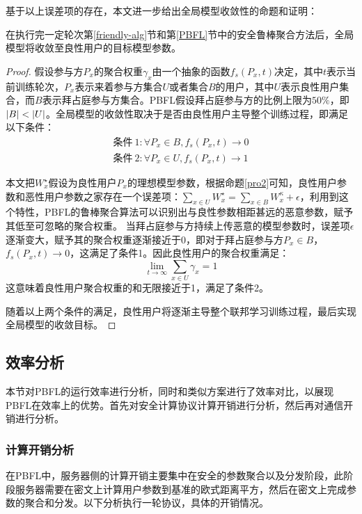 基于以上误差项的存在，本文进一步给出全局模型收敛性的命题和证明：
\begin{proposition}[收敛性]
	在执行完一定轮次第\ref{friendly-alg}节和第\ref{PBFL}节中的安全鲁棒聚合方法后，全局模型将收敛至良性用户的目标模型参数。
\end{proposition}

\begin{proof}
	假设参与方$P_x$的聚合权重$\gamma_{x}$由一个抽象的函数$f_s(P_x,t)$决定，其中$t$表示当前训练轮次，$P_x$表示来着参与方集合$U$或者集合$B$的用户，其中$ U $表示良性用户集合，而$ B $表示拜占庭参与方集合。PBFL假设拜占庭参与方的比例上限为$50\%$，即$\vert B\vert <\vert U\vert$。全局模型的收敛性取决于是否由良性用户主导整个训练过程，即满足以下条件：
	\begin{equation*}
		\begin{split}
			\mbox{条件}\ 1:{\forall}P_x \in B, f_s(P_x,t)\rightarrow 0 \\
			\mbox{条件}\ 2:{\forall}P_x \in U, f_s(P_x,t)\rightarrow 1
		\end{split}
	\end{equation*}
	
	本文把$W_x^{\star}$假设为良性用户$P_x$的理想模型参数，根据命题\ref{pro2}可知，良性用户参数和恶性用户参数之家存在一个误差项：$\sum_{x\in U}W_x^{\star}=   \sum_{x\in B}W_x^{\kappa} + \epsilon$，利用到这个特性，PBFL的鲁棒聚合算法可以识别出与良性参数相距甚远的恶意参数，赋予其低至可忽略的聚合权重。
	当拜占庭参与方持续上传恶意的模型参数时，误差项$\epsilon$逐渐变大，赋予其的聚合权重逐渐接近于0，即对于拜占庭参与方$P_x \in B$，$f_s(P_x, t)\rightarrow 0$，这满足了条件1。因此良性用户的聚合权重满足：
	$$
		\lim_{t \to \infty}\sum_{x \in U} \gamma_x = 1
	$$
	这意味着良性用户聚合权重的和无限接近于1，满足了条件2。
	
	随着以上两个条件的满足，良性用户将逐渐主导整个联邦学习训练过程，最后实现全局模型的收敛目标。
\end{proof}

\subsection{效率分析}
本节对PBFL的运行效率进行分析，同时和类似方案进行了效率对比，以展现PBFL在效率上的优势。首先对安全计算协议计算开销进行分析，然后再对通信开销进行分析。

\subsubsection{计算开销分析}
在PBFL中，服务器侧的计算开销主要集中在安全的参数聚合以及分发阶段，此阶段服务器需要在密文上计算用户参数到基准的欧式距离平方，然后在密文上完成参数的聚合和分发。以下分析执行一轮协议，具体的开销情况。

